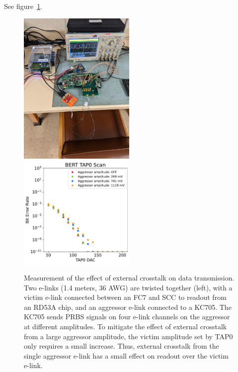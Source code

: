\documentclass[a4paper,11pt]{article}
\begin{document}
See figure~\ref{fig:external_crosstalk}.

\begin{figure}[htbp]
\centering
\includegraphics[width=0.5\textwidth,origin=c,angle=270]{../figures/external_crosstalk_setup.jpg}
\qquad
\includegraphics[width=0.5\textwidth,origin=c]{../figures/BERT_TAP0_Scan_External_Crosstalk.pdf}
\caption{
\label{fig:external_crosstalk}
Measurement of the effect of external crosstalk on data transmission.
Two e-links (1.4 meters, 36 AWG) are twisted together (left), with a victim e-link connected between an FC7 and SCC to readout from an RD53A chip, and an aggressor e-link connected to a KC705.
The KC705 sends PRBS signals on four e-link channels on the aggressor at different amplitudes.
To mitigate the effect of external crosstalk from a large aggressor amplitude, the victim amplitude set by TAP0 only requires a small increase.
Thus, external crosstalk from the single aggressor e-link has a small effect on readout over the victim e-link.
}
\end{figure}
\end{document}
